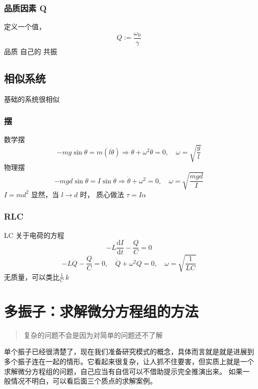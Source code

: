 \documentclass[11pt]{book}
\begin{document}
\subsection{品质因素 Q}
\label{sec:org720494e}
定义一个值，
\begin{equation}
\label{eq:52}
Q:=\frac{\omega_0}{\gamma}
\end{equation}
品质
自己的
共振
\section{相似系统}
\label{sec:orgb722deb}
基础的系统很相似
\subsection{摆}
\label{sec:orgf7d4802}
数学摆
\begin{equation}
\label{eq:simplePendulum}
-mg\sin\theta=m(l\ddot{\theta})\Rightarrow \theta+\omega^2\theta=0,\quad\omega=\sqrt{\frac{g}{l}}
\end{equation}
物理摆
\begin{equation}
\label{eq:physicalPendulum}
-mgd\sin \theta=I\sin\ddot{\theta} \Rightarrow \ddot{\theta}+\omega^2=0,\quad\omega=\sqrt{\frac{mgd}{I}}
\end{equation}
\(I=md^2\)
显然，当 \(l\rightarrow d\) 时，
质心做法
\(\tau=I\alpha\)
\subsection{RLC}
\label{sec:orgaa34231}
LC
关于电荷的方程
\begin{equation}
\label{eq:42}
-L \frac{\mathrm{d}I}{\mathrm{d}t}-\frac{Q}{C}=0
\end{equation}
\begin{equation}
\label{eq:45}
-L\ddot{Q}-\frac{Q}{C}=0,\quad \ddot{Q}+\omega^2Q=0,\quad \omega=\sqrt{\frac{1}{LC}}
\end{equation}
无质量，可以类比\(\frac{1}{C}~k\)
\chapter{多振子：求解微分方程组的方法}
\label{sec:org04448b2}
\begin{quote}
复杂的问题不会是因为对简单的问题还不了解
\end{quote}
单个振子已经很清楚了，现在我们准备研究模式的概念，具体而言就是就是进展到多个振子连在一起的情形。它看起来很复杂，让人抓不住要害，但实质上就是一个求解微分方程组的问题，自己应当有自信可以不借助提示完全推演出来。
如果一般情况不明白，可以看后面三个质点的求解案例。
\end{document}
